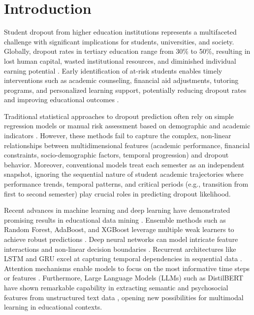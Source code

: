 \chapter{Introduction}

Student dropout from higher education institutions represents a multifaceted challenge with significant implications for students, universities, and society. Globally, dropout rates in tertiary education range from 30\% to 50\%, resulting in lost human capital, wasted institutional resources, and diminished individual earning potential \cite{tinto2012completing, rumberger2012dropping}. Early identification of at-risk students enables timely interventions such as academic counseling, financial aid adjustments, tutoring programs, and personalized learning support, potentially reducing dropout rates and improving educational outcomes \cite{heap2017dropout, aulck2016predicting}.

Traditional statistical approaches to dropout prediction often rely on simple regression models or manual risk assessment based on demographic and academic indicators \cite{delen2010comparative}. However, these methods fail to capture the complex, non-linear relationships between multidimensional features (academic performance, financial constraints, socio-demographic factors, temporal progression) and dropout behavior. Moreover, conventional models treat each semester as an independent snapshot, ignoring the sequential nature of student academic trajectories where performance trends, temporal patterns, and critical periods (e.g., transition from first to second semester) play crucial roles in predicting dropout likelihood.

Recent advances in machine learning and deep learning have demonstrated promising results in educational data mining \cite{romero2020educational, adnan2021student}. Ensemble methods such as Random Forest, AdaBoost, and XGBoost leverage multiple weak learners to achieve robust predictions \cite{yang2021student}. Deep neural networks can model intricate feature interactions and non-linear decision boundaries \cite{huang2020deep}. Recurrent architectures like LSTM and GRU excel at capturing temporal dependencies in sequential data \cite{liang2022student}. Attention mechanisms enable models to focus on the most informative time steps or features \cite{vaswani2017attention}. Furthermore, Large Language Models (LLMs) such as DistilBERT have shown remarkable capability in extracting semantic and psychosocial features from unstructured text data \cite{sanh2019distilbert}, opening new possibilities for multimodal learning in educational contexts.

